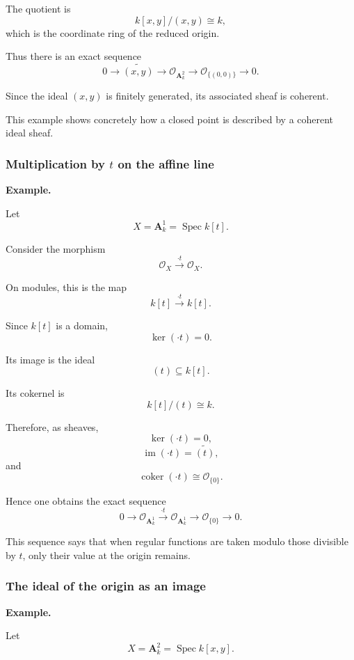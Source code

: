 The quotient is
\[
k[x,y]/(x,y)\cong k,
\]
which is the coordinate ring of the reduced origin.

Thus there is an exact sequence
\[
0
\longrightarrow
\widetilde{(x,y)}
\longrightarrow
\mathcal O_{\mathbf A^2_k}
\longrightarrow
\mathcal O_{\{(0,0)\}}
\longrightarrow
0.
\]

Since the ideal \((x,y)\) is finitely generated, its associated sheaf is coherent.

This example shows concretely how a closed point is described by a coherent ideal sheaf.

\subsubsection{Multiplication by \(t\) on the affine line}

\textbf{Example.}

Let
\[
X=\mathbf A^1_k=\operatorname{Spec}k[t].
\]

Consider the morphism
\[
\mathcal O_X
\xrightarrow{\cdot t}
\mathcal O_X.
\]

On modules, this is the map
\[
k[t]\xrightarrow{\cdot t}k[t].
\]

Since \(k[t]\) is a domain,
\[
\ker(\cdot t)=0.
\]

Its image is the ideal
\[
(t)\subseteq k[t].
\]

Its cokernel is
\[
k[t]/(t)\cong k.
\]

Therefore, as sheaves,
\[
\ker(\cdot t)=0,
\]
\[
\operatorname{im}(\cdot t)=\widetilde{(t)},
\]
and
\[
\operatorname{coker}(\cdot t)
\cong
\mathcal O_{\{0\}}.
\]

Hence one obtains the exact sequence
\[
0
\longrightarrow
\mathcal O_{\mathbf A^1_k}
\xrightarrow{\cdot t}
\mathcal O_{\mathbf A^1_k}
\longrightarrow
\mathcal O_{\{0\}}
\longrightarrow
0.
\]

This sequence says that when regular functions are taken modulo those divisible by \(t\), only their value at the origin remains.

\subsubsection{The ideal of the origin as an image}

\textbf{Example.}

Let
\[
X=\mathbf A^2_k=\operatorname{Spec}k[x,y].
\]

